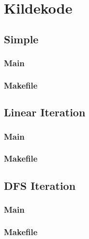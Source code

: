 \chapter{Kildekode}
\section{Simple}
\subsection{Main}

\subsection{Makefile}


\section{Linear Iteration}
\subsection{Main}

\subsection{Makefile}


\section{DFS Iteration}
\subsection{Main}

\subsection{Makefile}
